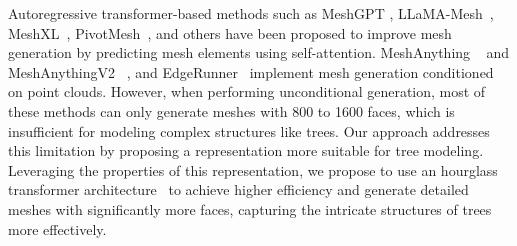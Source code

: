 Autoregressive transformer-based methods such as MeshGPT \cite{siddiqui2024meshgpt}, LLaMA-Mesh~\cite{wang2024llama}, MeshXL~\cite{chen2024meshxl}, PivotMesh~\cite{weng2024pivotmesh}, and others have been proposed to improve mesh generation by predicting mesh elements using self-attention. MeshAnything ~\cite{chen2024meshanything} and MeshAnythingV2 ~\cite{chen2024meshanything2}, and EdgeRunner~\cite{tang2024edgerunner} implement mesh generation conditioned on point clouds. However, when performing unconditional generation, most of these methods can only generate meshes with 800 to 1600 faces, which is insufficient for modeling complex structures like trees.
%
Our approach addresses this limitation by proposing a representation more suitable for tree modeling. Leveraging the properties of this representation, we propose to use an hourglass transformer architecture~\cite{nawrot2021hierarchical,hao2024meshtron} to achieve higher efficiency and generate detailed meshes with significantly more faces, capturing the intricate structures of trees more effectively.